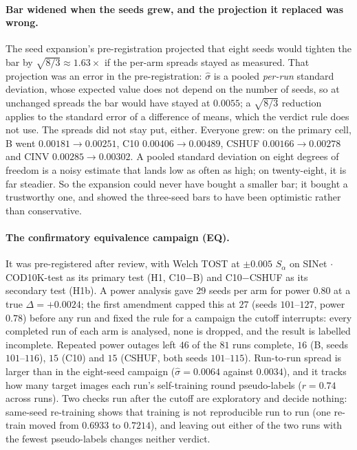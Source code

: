 \documentclass{article}
\newif\ifrevmarked \revmarkedtrue
\newenvironment{revblock}[1]{\ifrevmarked\color{#1}\fi}{}
\begin{document}
\paragraph{Bar widened when the seeds grew, and the projection it replaced was wrong.} The seed
expansion's pre-registration projected that eight seeds would tighten the bar by
$\sqrt{8/3} \approx 1.63\times$ if the per-arm spreads stayed as measured. That projection was an
error in the pre-registration: $\hat{\sigma}$ is a pooled \emph{per-run} standard deviation, whose
expected value does not depend on the number of seeds, so at unchanged spreads the bar would have
stayed at $0.0055$; a $\sqrt{8/3}$ reduction applies to the standard error of a difference of means,
which the verdict rule does not use. The spreads did not stay put, either. Everyone grew: on the primary cell, B went $0.00181 \rightarrow 0.00251$, C10 $0.00406 \rightarrow 0.00489$, CSHUF
$0.00166 \rightarrow 0.00278$ and CINV $0.00285 \rightarrow 0.00302$. A pooled standard deviation
on eight degrees of freedom is a noisy estimate that lands low as often as high; on twenty-eight, it
is far steadier. So the expansion could never have bought a smaller bar; it bought a trustworthy
one, and showed the three-seed bars to have been optimistic rather than conservative.



\begin{revblock}{RevShared}
\paragraph{The confirmatory equivalence campaign (EQ).} It was pre-registered after review, with Welch TOST at
$\pm 0.005$ $S_\alpha$ on SINet $\cdot$ COD10K-test as its primary test (H1, C10$-$B) and C10$-$CSHUF as its secondary
test (H1b). A power analysis gave $29$ seeds per arm for power $0.80$ at a true $\Delta = +0.0024$; the first amendment
capped this at $27$ (seeds $101$--$127$, power $0.78$) before any run and fixed the rule for a campaign the cutoff
interrupts: every completed run of each arm is analysed, none is dropped, and the result is labelled incomplete.
Repeated power outages left $46$ of the $81$ runs complete, $16$ (B, seeds $101$--$116$), $15$ (C10) and $15$ (CSHUF,
both seeds $101$--$115$). Run-to-run spread is larger than in the eight-seed campaign ($\hat\sigma = 0.0064$ against
$0.0034$), and it tracks how many target images each run's self-training round pseudo-labels ($r = 0.74$ across runs).
Two checks run after the cutoff are exploratory and decide nothing: same-seed re-training shows that training is not
reproducible run to run (one re-train moved from $0.6933$ to $0.7214$), and leaving out either of the two runs with the
fewest pseudo-labels changes neither verdict.
\end{revblock}
\end{document}
